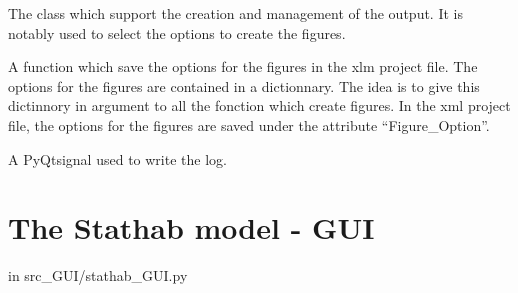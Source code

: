 \documentclass[letterpaper,10pt,english]{sphinxmanual}
\begin{document}

\begin{fulllineitems}
\label{\detokenize{index:src_GUI.output_fig_GUI.outputW}}
The class which support the creation and management of the output. It is notably used to select the options to
create the figures.

\begin{fulllineitems}
\label{\detokenize{index:src_GUI.output_fig_GUI.outputW.init_iu}}
\end{fulllineitems}


\begin{fulllineitems}
\label{\detokenize{index:src_GUI.output_fig_GUI.outputW.save_option_fig}}
A function which save the options for the figures in the xlm project file. The options for the figures are
contained in a dictionnary. The idea is to give this dictinnory in argument to all the fonction which create
figures. In the xml project file, the options for the figures are saved under the attribute ``Figure\_Option''.

\end{fulllineitems}


\begin{fulllineitems}
\label{\detokenize{index:src_GUI.output_fig_GUI.outputW.send_log}}
A PyQtsignal used to write the log.

\end{fulllineitems}


\end{fulllineitems}



\section{The Stathab model - GUI}
\label{\detokenize{index:the-stathab-model-gui}}
in src\_GUI/stathab\_GUI.py
\label{\detokenize{index:module-src_GUI.stathab_GUI}}
\end{document}
